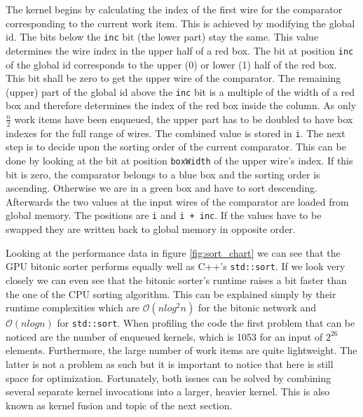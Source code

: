 

The kernel begins by calculating the index of the first wire for the comparator corresponding to the current work item. This is achieved by modifying the global id. The bits below the \lstinline!inc! bit (the lower part) stay the same. This value determines the wire index in the upper half of a red box. The bit at position \lstinline!inc! of the global id corresponds to the upper (0) or lower (1) half of the red box. This bit shall be zero to get the upper wire of the comparator. The remaining (upper) part of the global id above the \lstinline!inc! bit is a multiple of the width of a red box and therefore determines the index of the red box inside the column. As only $\frac{n}{2}$ work items have been enqueued, the upper part has to be doubled to have box indexes for the full range of wires. The combined value is stored in \lstinline!i!.
The next step is to decide upon the sorting order of the current comparator. This can be done by looking at the bit at position \lstinline!boxWidth! of the upper wire's index. If this bit is zero, the comparator belongs to a blue box and the sorting order is ascending. Otherwise we are in a green box and have to sort descending.
Afterwards the two values at the input wires of the comparator are loaded from global memory. The positions are \lstinline!i! and \lstinline!i + inc!. If the values have to be swapped they are written back to global memory in opposite order.

Looking at the performance data in figure \ref{fig:sort_chart} we can see that the GPU bitonic sorter performs equally well as C++'s \lstinline!std::sort!. If we look very closely we can even see that the bitonic sorter's runtime raises a bit faster than the one of the CPU sorting algorithm. This can be explained simply by their runtime complexities which are $\mathcal{O}(n log^2 n)$ for the bitonic network and $\mathcal{O}(n log n)$ for \lstinline!std::sort!.
When profiling the code the first problem that can be noticed are the number of enqueued kernels, which is 1053 for an input of $2^{26}$ elements. Furthermore, the large number of work items are quite lightweight. The latter is not a problem as such but it is important to notice that here is still space for optimization. Fortunately, both issues can be solved by combining several separate kernel invocations into a larger, heavier kernel. This is also known as kernel fusion and topic of the next section.


